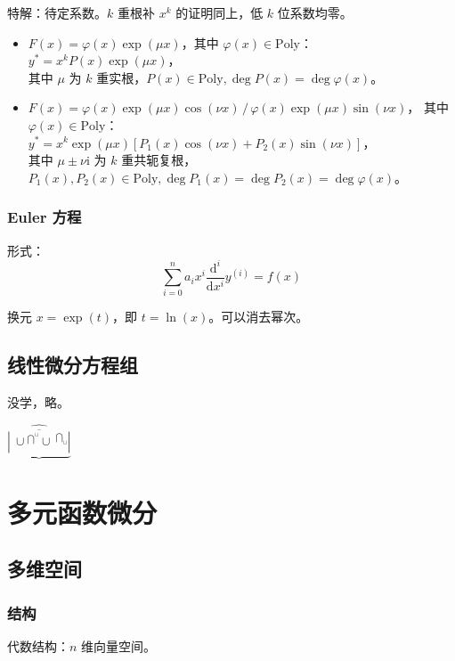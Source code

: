\documentclass[12pt, a4paper, UTF8, openany]{ctexbook}
\newcommand{\dif}{\mathrm{d}}
\newcommand{\imunit}{\mathrm{i}}%
\begin{document}
        特解：待定系数。$k$ 重根补 $x^k$ 的证明同上，低 $k$ 位系数均零。
        \begin{itemize}
            \item $F(x) = \varphi(x)\exp(\mu x)$，其中 $\varphi(x) \in \mathrm{Poly}$：\\
                $y^\ast = x^k P(x) \exp(\mu x)$，\\
                其中 $\mu$ 为 $k$ 重实根，$P(x) \in \mathrm{Poly}, \deg P(x) = \deg\varphi(x)$。
            \item $F(x) = \varphi(x)\exp(\mu x)\cos(\nu x) \, / \, \varphi(x)\exp(\mu x)\sin(\nu x)$，
                其中 $\varphi(x) \in \mathrm{Poly}$：\\
                $y^\ast = x^k\exp(\mu x)[P_1(x)\cos(\nu x) + P_2(x)\sin(\nu x)]$，\\
                其中 $\mu \pm \nu\imunit$ 为 $k$ 重共轭复根，
                $P_1(x),P_2(x) \in \mathrm{Poly}, \deg P_1(x) = \deg P_2(x) = \deg\varphi(x)$。
        \end{itemize}

        \subsection{Euler 方程}
        形式：
        $$\sum_{i = 0}^{n} a_i x^i \frac{\dif^i}{\dif x^{i}} y^{(i)} = f(x)$$

        换元 $x = \exp(t)$，即 $t = \ln(x)$。可以消去幂次。

    \section{线性微分方程组}
    没学，略。

    $\underbrace
    {
        \widehat
        {
            \overline
            {
                \left|
                \stackrel {\ } {\ \cup}
                \stackrel {\bigcap ^ \cup} {}
                \stackrel {\ } {\cup ^ {\ }}
                \stackrel {\bigcap_\cup} {}
                \right|
            }
        }
    }$

    \chapter{多元函数微分}
    \section{多维空间}
        \subsection{结构}
        代数结构：$n$ 维向量空间。
\end{document}
